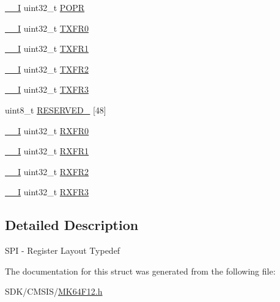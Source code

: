 \begin{DoxyCompactItemize}
\begin{tabbing}
\end{tabbing}\item 
\mbox{\hyperlink{core__cm4_8h_af63697ed9952cc71e1225efe205f6cd3}{\+\_\+\+\_\+I}} uint32\+\_\+t \mbox{\hyperlink{group___v_r_e_f___peripheral___access___layer_ga7adaf881f37145caba5861609765d994}{P\+O\+PR}}
\item 
\mbox{\hyperlink{core__cm4_8h_af63697ed9952cc71e1225efe205f6cd3}{\+\_\+\+\_\+I}} uint32\+\_\+t \mbox{\hyperlink{group___v_r_e_f___peripheral___access___layer_ga32896f14fd2897523a91974664932241}{T\+X\+F\+R0}}
\item 
\mbox{\hyperlink{core__cm4_8h_af63697ed9952cc71e1225efe205f6cd3}{\+\_\+\+\_\+I}} uint32\+\_\+t \mbox{\hyperlink{group___v_r_e_f___peripheral___access___layer_ga27755ff1a835bbd95f58ecdba1f2795b}{T\+X\+F\+R1}}
\item 
\mbox{\hyperlink{core__cm4_8h_af63697ed9952cc71e1225efe205f6cd3}{\+\_\+\+\_\+I}} uint32\+\_\+t \mbox{\hyperlink{group___v_r_e_f___peripheral___access___layer_ga331a5555b34b49975fd14f52d0989790}{T\+X\+F\+R2}}
\item 
\mbox{\hyperlink{core__cm4_8h_af63697ed9952cc71e1225efe205f6cd3}{\+\_\+\+\_\+I}} uint32\+\_\+t \mbox{\hyperlink{group___v_r_e_f___peripheral___access___layer_gabb7709e9633e66598f149c96d12e2640}{T\+X\+F\+R3}}
\item 
uint8\+\_\+t \mbox{\hyperlink{group___v_r_e_f___peripheral___access___layer_gad7de7b234e4846024bdeb9198f89edba}{R\+E\+S\+E\+R\+V\+E\+D\+\_}} \mbox{[}48\mbox{]}
\item 
\mbox{\hyperlink{core__cm4_8h_af63697ed9952cc71e1225efe205f6cd3}{\+\_\+\+\_\+I}} uint32\+\_\+t \mbox{\hyperlink{group___v_r_e_f___peripheral___access___layer_gac60db58d1ff9c9bae1ff1460dd6972ab}{R\+X\+F\+R0}}
\item 
\mbox{\hyperlink{core__cm4_8h_af63697ed9952cc71e1225efe205f6cd3}{\+\_\+\+\_\+I}} uint32\+\_\+t \mbox{\hyperlink{group___v_r_e_f___peripheral___access___layer_gafdbe91d4e8ea80ec8bcc8c89551429e1}{R\+X\+F\+R1}}
\item 
\mbox{\hyperlink{core__cm4_8h_af63697ed9952cc71e1225efe205f6cd3}{\+\_\+\+\_\+I}} uint32\+\_\+t \mbox{\hyperlink{group___v_r_e_f___peripheral___access___layer_gac4caeaac62400fb5d871f11574557a22}{R\+X\+F\+R2}}
\item 
\mbox{\hyperlink{core__cm4_8h_af63697ed9952cc71e1225efe205f6cd3}{\+\_\+\+\_\+I}} uint32\+\_\+t \mbox{\hyperlink{group___v_r_e_f___peripheral___access___layer_gaa997d3f01aca2c5e21a526b29e466f27}{R\+X\+F\+R3}}
\end{DoxyCompactItemize}


\subsection{Detailed Description}
S\+PI -\/ Register Layout Typedef 

The documentation for this struct was generated from the following file\+:\begin{DoxyCompactItemize}
\item 
S\+D\+K/\+C\+M\+S\+I\+S/\mbox{\hyperlink{_m_k64_f12_8h}{M\+K64\+F12.\+h}}\end{DoxyCompactItemize}
